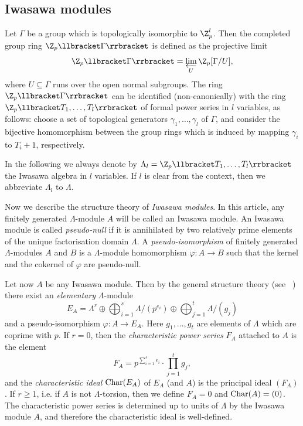 \subsection{Iwasawa modules} \label{section:notation_iw-modules} 
Let $\Gamma$ be a group which is topologically isomorphic to $\Z_p^l$. Then the completed group ring $\Z_p\llbracket \Gamma\rrbracket $ is defined as the projective limit 
\[ \Z_p\llbracket \Gamma\rrbracket = \varprojlim_{U} \Z_p[\Gamma/U],\] 
where ${U \subseteq \Gamma}$ runs over the open normal subgroups. The ring $\Z_p\llbracket \Gamma\rrbracket $ can be identified (non-canonically) with the ring $\Z_p\llbracket T_1, \ldots, T_l\rrbracket $ of formal power series in $l$ variables, as follows: choose a set of topological generators ${\gamma_1, \ldots, \gamma_l}$ of $\Gamma$, and consider the bijective homomorphism between the group rings which is induced by mapping $\gamma_i$ to ${T_i + 1}$, respectively. 

In the following we always denote by $\Lambda_l = \Z_p\llbracket T_1, \ldots, T_l \rrbracket $ the Iwasawa algebra in $l$ variables. If $l$ is clear from the context, then we abbreviate $\Lambda_l$ to $\Lambda$. 

Now we describe the structure theory of \emph{Iwasawa modules}. In this article, any finitely generated $\Lambda$-module $A$ will be called an Iwasawa module. An Iwasawa module is called \emph{pseudo-null} if it is annihilated by two relatively prime elements of the unique factorisation domain $\Lambda$. A \emph{pseudo-isomorphism} of finitely generated $\Lambda$-modules $A$ and $B$ is a $\Lambda$-module homomorphism ${\varphi \colon A \longrightarrow B}$ such that the kernel and the cokernel of $\varphi$ are pseudo-null. 

Let now $A$ be any Iwasawa module. Then by the general structure theory (see ~\cite[Section~5.1]{nsw}) there exist an \emph{elementary} $\Lambda$-module 
\[ E_A = \Lambda^r \oplus \bigoplus_{i = 1}^s \Lambda/(p^{e_i}) \oplus \bigoplus_{j = 1}^t \Lambda/(g_j) \] 
and a pseudo-isomorphism ${\varphi \colon A \longrightarrow E_A}$. Here $g_1, \ldots, g_t$ are elements of $\Lambda$ which are coprime with $p$. If ${r = 0}$, then the \emph{characteristic power series} $F_A$ attached to $A$ is the element 
\[ F_A = p^{\sum_{i = 1}^s e_i} \cdot \prod_{j = 1}^t g_j, \] 
and the \emph{characteristic ideal} $\textup{Char}(E_A)$ of $E_A$  (and $A$) is the principal ideal $(F_A)$. If ${r \ge 1}$, i.e. if $A$ is not $\Lambda$-torsion, then we define ${F_A = 0}$ and ${\textup{Char}(A) = (0)}$. The characteristic power series is determined up to units of $\Lambda$ by the Iwasawa module $A$, and therefore the characteristic ideal is well-defined. 

